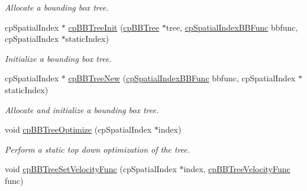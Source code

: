 \begin{DoxyCompactItemize}
\begin{DoxyCompactList}\small\item\em Allocate a bounding box tree. \end{DoxyCompactList}\item 
\hypertarget{group__cp_spatial_index_ga2c7d3e7cda09354f2a15fce6c28e2a81}{cp\-Spatial\-Index $\ast$ \hyperlink{group__cp_spatial_index_ga2c7d3e7cda09354f2a15fce6c28e2a81}{cp\-B\-B\-Tree\-Init} (\hyperlink{structcp_b_b_tree}{cp\-B\-B\-Tree} $\ast$tree, \hyperlink{group__cp_spatial_index_gafbecd34bd436d4a56200b7a542d94fc1}{cp\-Spatial\-Index\-B\-B\-Func} bbfunc, cp\-Spatial\-Index $\ast$static\-Index)}\label{group__cp_spatial_index_ga2c7d3e7cda09354f2a15fce6c28e2a81}

\begin{DoxyCompactList}\small\item\em Initialize a bounding box tree. \end{DoxyCompactList}\item 
\hypertarget{group__cp_spatial_index_gadc8bdef1e33f3c238bf17394b94eacb6}{cp\-Spatial\-Index $\ast$ \hyperlink{group__cp_spatial_index_gadc8bdef1e33f3c238bf17394b94eacb6}{cp\-B\-B\-Tree\-New} (\hyperlink{group__cp_spatial_index_gafbecd34bd436d4a56200b7a542d94fc1}{cp\-Spatial\-Index\-B\-B\-Func} bbfunc, cp\-Spatial\-Index $\ast$static\-Index)}\label{group__cp_spatial_index_gadc8bdef1e33f3c238bf17394b94eacb6}

\begin{DoxyCompactList}\small\item\em Allocate and initialize a bounding box tree. \end{DoxyCompactList}\item 
\hypertarget{group__cp_spatial_index_ga299b4e2193ff1df336c925857334364f}{void \hyperlink{group__cp_spatial_index_ga299b4e2193ff1df336c925857334364f}{cp\-B\-B\-Tree\-Optimize} (cp\-Spatial\-Index $\ast$index)}\label{group__cp_spatial_index_ga299b4e2193ff1df336c925857334364f}

\begin{DoxyCompactList}\small\item\em Perform a static top down optimization of the tree. \end{DoxyCompactList}\item 
\hypertarget{group__cp_spatial_index_gaf01118b5105cf3136d4ee6cf372539d5}{void \hyperlink{group__cp_spatial_index_gaf01118b5105cf3136d4ee6cf372539d5}{cp\-B\-B\-Tree\-Set\-Velocity\-Func} (cp\-Spatial\-Index $\ast$index, \hyperlink{group__cp_spatial_index_gaa256addb4f65c6846dfc306ef62a3988}{cp\-B\-B\-Tree\-Velocity\-Func} func)}\label{group__cp_spatial_index_gaf01118b5105cf3136d4ee6cf372539d5}


\end{DoxyCompactItemize}

